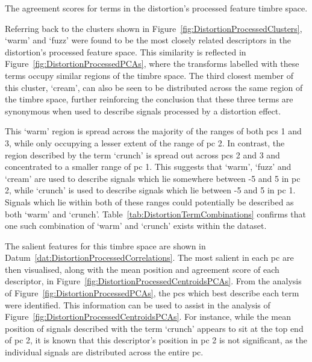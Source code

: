 			\begin{table}[h!]
				\centering
				
				\caption{The agreement scores for terms in the 
					 distortion's processed feature timbre space.}
				\label{tab:DistortionProcessedAgreements}
			\end{table}

			Referring back to the clusters shown in Figure~\ref{fig:DistortionProcessedClusters}, `warm' and
			`fuzz' were found to be the most closely related descriptors in the distortion's processed feature
			space. This similarity is reflected in Figure~\ref{fig:DistortionProcessedPCAs}, where the
			transforms labelled with these terms occupy similar regions of the timbre space. The third closest
			member of this cluster, `cream', can also be seen to be distributed across the same region of the
			timbre space, further reinforcing the conclusion that these three terms are synonymous when used to
			describe signals processed by a distortion effect.

			This `warm' region is spread across the majority of the ranges of both \acrshort{pc}s 1 and 3,
			while only occupying a lesser extent of the range of \acrshort{pc} 2. In contrast, the region
			described by the term `crunch' is spread out across \acrshort{pc}s 2 and 3 and concentrated to a
			smaller range of \acrshort{pc} 1. This suggests that `warm', `fuzz' and `cream' are used to
			describe signals which lie somewhere between -5 and 5 in \acrshort{pc} 2, while `crunch' is used to
			describe signals which lie between -5 and 5 in \acrshort{pc} 1.  Signals which lie within both of
			these ranges could potentially be described as both `warm' and `crunch'.
			Table~\ref{tab:DistortionTermCombinations} confirms that one such combination of `warm' and
			`crunch' exists within the dataset.

			The salient features for this timbre space are shown in
			Datum~\ref{dat:DistortionProcessedCorrelations}. The most salient in each \acrshort{pc} are then
			visualised, along with the mean position and agreement score of each descriptor, in
			Figure~\ref{fig:DistortionProcessedCentroidsPCAs}. From the analysis of
			Figure~\ref{fig:DistortionProcessedPCAs}, the \acrshort{pc}s which best describe each term were
			identified. This information can be used to assist in the analysis of
			Figure~\ref{fig:DistortionProcessedCentroidsPCAs}. For instance, while the mean position of signals
			described with the term `crunch' appears to sit at the top end of \acrshort{pc} 2, it is known that
			this descriptor's position in \acrshort{pc} 2 is not significant, as the individual signals are
			distributed across the entire \acrshort{pc}.

